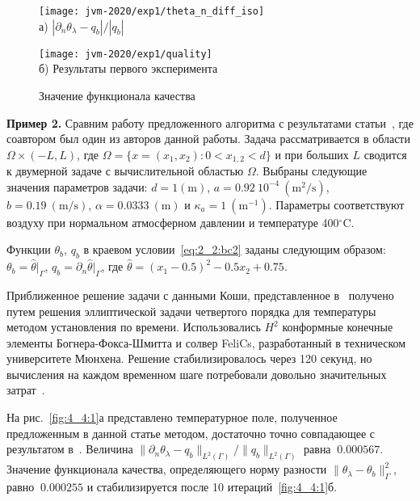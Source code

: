 \begin{figure}[ht]
    \begin{minipage}[b][][b]{0.49\linewidth}
        \centering
        \texttt{[image: jvm-2020/exp1/theta\_n\_diff\_iso]}
        \\ а) $|\partial_n\theta_\lambda-q_b|/|q_b|$
    \end{minipage}
    \hfill
    \begin{minipage}[b][][b]{0.49\linewidth}
        \centering
        \texttt{[image: jvm-2020/exp1/quality]}
        \\ б) Результаты первого эксперимента
    \end{minipage}
    \caption{Значение функционала качества}
    \label{fig:4_4:0}
\end{figure}

\textbf{Пример 2.}
Сравним работу предложенного алгоритма с результатами статьи~\cite{Chebotarev2019Problem},
где соавтором был один из авторов данной работы.
Задача рассматривается в области $\Omega \times (-L,L)$,
где $\Omega = \{ x = (x_1,x_2) \colon 0 < x_{1,2} < d\}$
и при больших $L$ сводится к двумерной задаче с вычислительной областью $\Omega$.
Выбраны следующие значения параметров задачи:
$d = \mathrm{1(m)}$, $a = 0.92~10^{-4}~\mathrm{(m^2/s)}$, $b= 0.19~\mathrm{(m/s)}$,
$\alpha = 0.0333~\mathrm{(m)}$ и $\kappa_a = 1~\mathrm{(m^{-1})}$.
Параметры соответствуют воздуху при нормальном атмосферном давлении и температуре 400$^\circ$C\@.

Функции $\theta_b$, $q_b$ в краевом условии~\eqref{eq:2_2:bc2} заданы следующим образом:
$\theta_b = \widehat{\theta}|_{\Gamma}$, $q_b = \partial_n \widehat{\theta}|_{\Gamma}$, где
$\widehat{\theta} = (x_1-0.5)^2 - 0.5x_2+0.75$.

Приближенное решение задачи с данными Коши, представленное в~\cite{Chebotarev2019Problem}
получено путем решения эллиптической задачи четвертого
порядка для температуры методом установления по времени.
Использовались $H^2$ конформные конечные элементы Богнера-Фокса-Шмитта и
солвер FeliCs, разработанный в техническом университете Мюнхена.
Решение стабилизировалось через 120 секунд, но вычисления на каждом временном
шаге потребовали довольно значительных затрат~\cite{Chebotarev2019Problem}.

На рис.~\ref{fig:4_4:1}а представлено температурное поле, полученное
предложенным в данной статье методом, достаточно
точно совпадающее с результатом в~\cite{Chebotarev2019Problem}.
Величина $\|\partial_n\theta_\lambda-q_b\|_{L^2(\Gamma)}/\|q_b\|_{L^2(\Gamma)}$ равна $~0.000567$.
Значение функционала качества, определяющего норму разности $\|\theta_\lambda -\theta_b\|^2_\Gamma$,
равно $~0.000255$ и стабилизируется после 10 итераций~\ref{fig:4_4:1}б.

